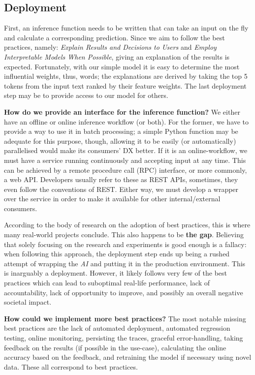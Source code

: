 \subsection{Deployment}

First, an inference function needs to be written that can take an input on the fly and calculate a corresponding prediction. Since we aim to follow the best practices, namely: \textit{Explain Results and Decisions to Users} and \textit{Employ Interpretable Models When Possible}, giving an explanation of the results is expected. Fortunately, with our simple model it is easy to determine the most influential weights, thus, words; the explanations are derived by taking the top 5 tokens from the input text ranked by their feature weights. The last deployment step may be to provide access to our model for others.

\begin{displayquote}
\textbf{How do we provide an interface for the inference function?} We either have an offline or online inference workflow (or both). For the former, we have to provide a way to use it in batch processing; a simple Python function may be adequate for this purpose, though, allowing it to be easily (or automatically) parallelised would make its consumers' DX better. If it is an online-workflow, we must have a service running continuously and accepting input at any time. This can be achieved by a remote procedure call (RPC) interface, or more commonly, a web API. Developers usually refer to these as REST APIs, sometimes, they even follow the conventions of REST. Either way, we must develop a wrapper over the service in order to make it available for other internal/external consumers.
\end{displayquote}

According to the body of research on the adoption of best practices, this is where many real-world projects conclude. This also happens to be \textbf{the gap}. Believing that solely focusing on the research and experiments is good enough is a fallacy: when following this approach, the deployment step ends up being a rushed attempt of wrapping the \textit{AI} and putting it in the production environment. This is inarguably a deployment. However, it likely follows very few of the best practices which can lead to suboptimal real-life performance, lack of accountability, lack of opportunity to improve, and possibly an overall negative societal impact.

\begin{displayquote}
\textbf{How could we implement more best practices?} The most notable missing best practices are the lack of automated deployment, automated regression testing, online monitoring, persisting the traces, graceful error-handling, taking feedback on the results (if possible in the use-case), calculating the online accuracy based on the feedback, and retraining the model if necessary using novel data. These all correspond to best practices.
\end{displayquote}

